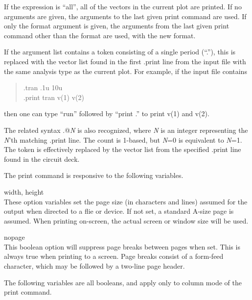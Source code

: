 If the expression is ``{\vt all}'', all of the vectors in the current
plot are printed.  If no arguments are given, the arguments to the
last given {\cb print} command are used.  If only the format argument
is given, the arguments from the last given {\cb print} command other
than the format are used, with the new format.

If the argument list contains a token consisting of a single period
(``.''), this is replaced with the vector list found in the first {\vt
.print} line from the input file with the same analysis type as the
current plot.  For example, if the input file contains
\begin{quote}\vt
    .tran .1u 10u\\
    .print tran v(1) v(2)\\
\end{quote}
then one can type ``{\vt run}'' followed by ``{\vt print .}'' to print
{\vt v(1)} and {\vt v(2)}.

The related syntax {\vt .@}{\it N} is also recognized, where {\it N}
is an integer representing the {\it N\/}'th matching {\vt .print} line. 
The count is 1-based, but {\it N\/}=0 is equivalent to {\it N\/}=1. 
The token is effectively replaced by the vector list from the
specified {\vt .print} line found in the circuit deck.

The print command is responsive to the following variables.

\begin{description}
\item{{\et width}, {\et height}}\\
These option variables set the page size (in characters and lines)
assumed for the output when directed to a flie or device.  If not set,
a standard A-size page is assumed.  When printing on-screen, the
actual screen or window size will be used.

\item{\et nopage}\\
This boolean option will suppress page breaks between pages when set. 
This is always true when printing to a screen.  Page breaks consist of
a form-feed character, which may be followed by a two-line page
header.
\end{description}

The following variables are all booleans, and apply only to column
mode of the {\cb print} command.

